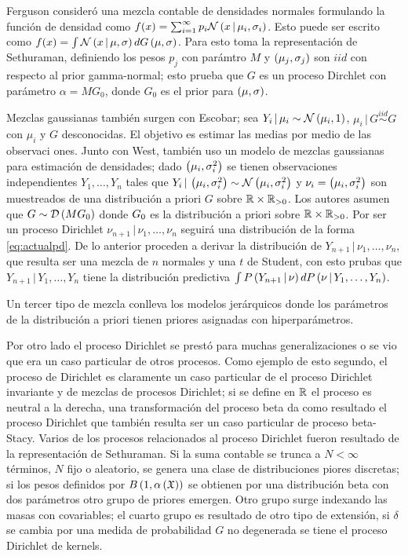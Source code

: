 \documentclass[runningheads,a4paper]{article}
\begin{document}
Ferguson consideró una mezcla contable de densidades normales formulando la función de densidad como $f(x) = \sum_{i = %
1}^{\infty} p_{i} \Nor\Pp{x \,|\, \mu_{i}, \sigma_{i}}$. Esto puede ser escrito como $f(x) = \int \Nor\Pp{x \,|\, \mu, %
\sigma} dG\Pp{\mu, \sigma}$. Para esto toma la representación de Sethuraman, definiendo los pesos $p_{j}$ con parámtro %
$M$ y $\left( \mu_{j}, \sigma_{j} \right)$ son $iid$ con respecto al prior gamma-normal; esto prueba que $G$ es un proceso Dirchlet %
con parámetro $\alpha = M G_{0}$, donde $G_{0}$ es el prior para $\left( \mu, \sigma \right)$.

Mezclas gaussianas también surgen con Escobar; sea $Y_{i} \,|\, \mu_{i} \sim \mathcal{N}\left( \mu_{i}, 1 \right)$, $\mu_{i} \,|\, G %
\stackrel{iid}{\sim} G$ con $\mu_{i}$ y $G$ desconocidas. El objetivo es estimar las medias por medio de las observaci%
ones. Junto con West, también uso un modelo de mezclas gaussianas para estimación de densidades; dado $\Pp{\mu_{i}, %
\sigma_{i}^{2}}$ se tienen observaciones independientes $Y_{1}, \ldots, Y_{n}$ tales que $Y_{i} \,|\, \Pp{\mu_{i}, %
\sigma_{i}^{2}} \sim \Nor\Pp{\mu_{i}, \sigma_{i}^{2}}$ y $\nu_{i} = \left( \mu_{i}, \sigma_{i}^{2} \right)$ son muestreados de %
una distribución a priori $G$ sobre $\mathbb{R} \times \mathbb{R}_{> 0}$. Los autores asumen que $G \sim \mathcal{D}\left( M G_{0} \right)$ donde $G_{%
0}$ es la distribución a priori sobre $\mathbb{R} \times \mathbb{R}_{> 0}$. Por ser un proceso Dirichlet $\nu_{n+1} \,|\, \nu_{1}, %
\ldots, \nu_{n}$ seguirá una distribución de la forma \eqref{eq:actualpd}. De lo anterior proceden a derivar la %
distribución de $Y_{n+1} \,|\, \nu_{1}, \ldots, \nu_{n}$, que resulta ser una mezcla de $n$ normales y una $t$ de %
Student, con esto prubas que  $Y_{n+1} \,|\, Y_{1},\ldots, Y_{n}$ tiene la distribución predictiva $\int P\Pp{%
Y_{n+1} \,|\, \mathbf{\nu}} dP\Pp{\mathbf{\nu} \,|\, Y_{1}, \ldots, Y_{n}}$.

Un tercer tipo de mezcla conlleva los modelos jerárquicos donde los parámetros de la distribución a priori tienen %
priores asignadas con hiperparámetros. 

Por otro lado el proceso Dirichlet se prestó para muchas generalizaciones o se vio que era un caso particular de %
otros procesos. Como ejemplo de esto segundo, el proceso de Dirichlet es claramente un caso particular de el %
proceso Dirichlet invariante y de mezclas de procesos Dirichlet; si se define en $\mathbb{R}$ el proceso es neutral a la %
derecha, una transformación del proceso beta da como resultado el proceso Dirichlet que también resulta ser un %
caso particular de proceso beta-Stacy. Varios de los procesos relacionados al proceso Dirichlet fueron resultado %
de la representación de Sethuraman. Si la suma contable se trunca a $N < \infty$ términos, $N$ fijo o aleatorio, %
se genera una clase de distribuciones piores discretas; si los pesos definidos por $B\left( 1, \alpha\left( \mathfrak{X} \right) \right)$ se %
obtienen por una distribución beta con dos parámetros otro grupo de priores emergen. Otro grupo surge indexando %
las masas con covariables; el cuarto grupo es resultado de otro tipo de extensión, si $\delta$ se cambia por %
una medida de probabilidad $G$ no degenerada se tiene el proceso Dirichlet de kernels.
\end{document}
